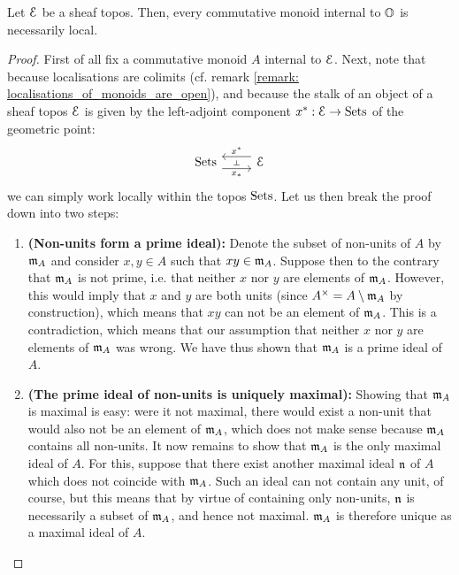                 \begin{lemma} \label{lemma: monoids_in_topoi_are_local}
                    Let $\mathcal{E}$ be a sheaf topos. Then, every commutative monoid internal to $\mathbb{O}$ is necessarily local.
                \end{lemma}
                    \begin{proof}
                    First of all fix a commutative monoid $A$ internal to $\mathcal{E}$. Next, note that because localisations are colimits (cf. remark \ref{remark: localisations_of_monoids_are_open}), and because the stalk of an object of a sheaf topos $\mathcal{E}$ is given by the left-adjoint component $x^*: \mathcal{E} \to \mathrm{Sets}$ of the geometric point:
                        $$
                            \begin{tikzcd}
                            	\Sets & \E
                            	\arrow[""{name=0, anchor=center, inner sep=0}, "{x_*}"', shift right=2, from=1-1, to=1-2]
                            	\arrow[""{name=1, anchor=center, inner sep=0}, "{x^*}"', shift right=2, from=1-2, to=1-1]
                            	\arrow["\dashv"{anchor=center, rotate=-90}, draw=none, from=1, to=0]
                            \end{tikzcd}
                        $$
                    we can simply work locally within the topos $\mathrm{Sets}$. Let us then break the proof down into two steps:
                        \begin{enumerate}
                            \item \textbf{(Non-units form a prime ideal):} Denote the subset of non-units of $A$ by $\mathfrak{m}_A$ and consider $x, y \in A$ such that $xy \in \mathfrak{m}_A$. Suppose then to the contrary that $\mathfrak{m}_A$ is not prime, i.e. that neither $x$ nor $y$ are elements of $\mathfrak{m}_A$. However, this would imply that $x$ and $y$ are both units (since $A^{\x} = A \setminus \m_A$ by construction), which means that $xy$ can not be an element of $\mathfrak{m}_A$. This is a contradiction, which means that our assumption that neither $x$ nor $y$ are elements of $\mathfrak{m}_A$ was wrong. We have thus shown that $\mathfrak{m}_A$ is a prime ideal of $A$.  
                            \item \textbf{(The prime ideal of non-units is uniquely maximal):} Showing that $\mathfrak{m}_A$ is maximal is easy: were it not maximal, there would exist a non-unit that would also not be an element of $\mathfrak{m}_A$, which does not make sense because $\mathfrak{m}_A$ contains all non-units. It now remains to show that $\mathfrak{m}_A$ is the only maximal ideal of $A$. For this, suppose that there exist another maximal ideal $\mathfrak{n}$ of $A$ which does not coincide with $\mathfrak{m}_A$. Such an ideal can not contain any unit, of course, but this means that by virtue of containing only non-units, $\mathfrak{n}$ is necessarily a subset of $\mathfrak{m}_A$, and hence not maximal. $\mathfrak{m}_A$ is therefore unique as a maximal ideal of $A$. 
                        \end{enumerate}
                    \end{proof}
